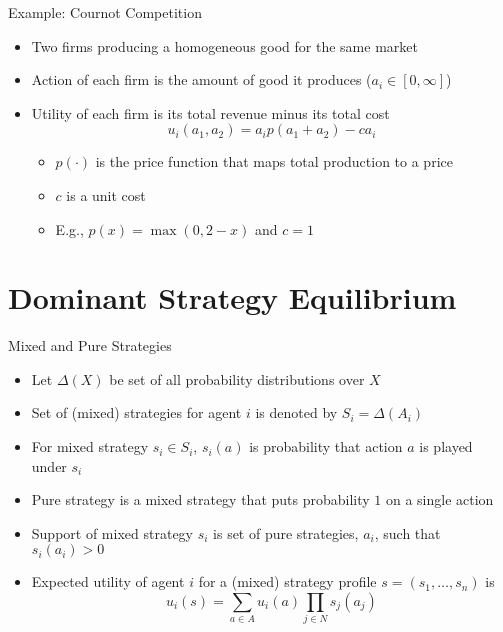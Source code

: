 \documentclass[11pt,aspectratio=169]{beamer}
\begin{document}
  \begin{frame}{Example: Cournot Competition}
   \begin{itemize}
    \item Two firms producing a homogeneous good for the same market
    \item Action of each firm is the amount of good it produces ($a_i \in [0,\infty]$)
    \item Utility of each firm is its total revenue minus its total cost
     $$u_i(a_1,a_2) = a_i p(a_1 + a_2) - c a_i$$
    \begin{itemize}[<2->]
     \item $p(\cdot)$ is the price function that maps total production to a price
     \item$c$ is a unit cost
     \item E.g., $p(x) = \max(0, 2 - x)$ and $c = 1$
    \end{itemize}
   \end{itemize}
  \end{frame}
  
 \section{Dominant Strategy Equilibrium}
  \begin{frame}{Mixed and Pure Strategies}
   \begin{itemize}[<+->]
    \setlength{\itemsep}{0.56em}
    \item Let $\Delta(X)$ be set of all probability distributions over $X$
    \item Set of \alert{(mixed) strategies} for agent $i$ is denoted by $S_i = \Delta(A_i)$
    \item For mixed strategy $s_i \in S_i$, $s_i(a)$ is probability that action $a$ is played under $s_i$
    \item \alert{Pure strategy} is a mixed strategy that puts probability $1$ on a single action
    \item \alert{Support} of mixed strategy $s_i$ is set of pure strategies, $a_i$, such that $s_i(a_i) > 0$
    \item Expected utility of agent $i$ for a (mixed) \alert{strategy profile} $s = (s_1,\dots,s_n)$ is
     $$u_i(s) = \sum_{a\in A} u_i(a) \prod_{j\in N}s_j(a_j)$$ 
   \end{itemize}
  \end{frame}
  
\end{document}
